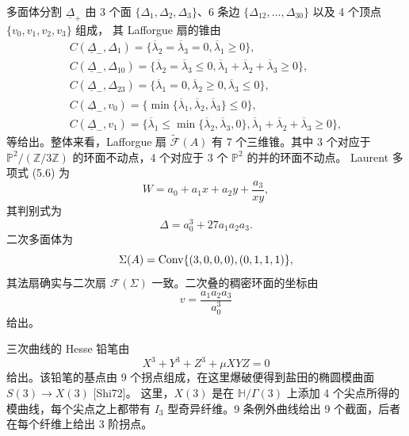 多面体分割 $\underline{\Delta}_{+}$ 由 3 个面 $\{\Delta_{1},\Delta_{2},\Delta_{3}\}$、6 条边
$\{\Delta_{12},\ldots,\Delta_{30}\}$ 以及 4 个顶点 $\{v_{0},v_{1},v_{2},v_{3}\}$ 组成，
其 Lafforgue 扇的锥由
\begin{gather*}
  C(\underline{\Delta}_{-},\Delta_{1})=\{\overline{\lambda}_{2}=\overline{\lambda}_{3}=0,\overline{\lambda}_{1}\ge 0\},\\
  C(\underline{\Delta}_{-},\Delta_{10})=\{\overline{\lambda}_{2}=\overline{\lambda}_{3}\le 0,\overline{\lambda}_{1}+\overline{\lambda}_{2}+\overline{\lambda}_{3}\ge 0\},\\
  C(\underline{\Delta}_{-},\Delta_{23})=\{\overline{\lambda}_{1}=0,\overline{\lambda}_{2}\ge 0,\overline{\lambda}_{3}\le 0\},\\
  C(\underline{\Delta}_{-},v_{0})=\{\min\{\overline{\lambda}_{1},\overline{\lambda}_{2},\overline{\lambda}_{3}\}\le 0\},\\
  C(\underline{\Delta}_{-},v_{1})=\{\overline{\lambda}_{1}\le\min\{\overline{\lambda}_{2},\overline{\lambda}_{3},0\},\overline{\lambda}_{1}+\overline{\lambda}_{2}+\overline{\lambda}_{3}\ge 0\},
\end{gather*}
等给出。整体来看，Lafforgue 扇 $\tilde{\mathcal{F}}(A)$ 有 7 个三维锥。其中 3 个对应于
$\mathbb{P}^{2}/(\mathbb{Z}/3\mathbb{Z})$ 的环面不动点，4 个对应于 3 个 $\mathbb{P}^{2}$ 的并的环面不动点。
Laurent 多项式 (5.6) 为
\begin{equation}
  W=a_{0}+a_{1}x+a_{2}y+\frac{a_{3}}{xy}, \tag{7.3}
\end{equation}
其判别式为
\[
  \Delta=a_{0}^{3}+27a_{1}a_{2}a_{3}.
\]
二次多面体为
\[
  \Sigma(A)=\operatorname{Conv}\{(3,0,0,0),(0,1,1,1)\},
\]
其法扇确实与二次扇 $\mathcal{F}(\Sigma)$ 一致。二次叠的稠密环面的坐标由
\begin{equation}
  v=\frac{a_{1}a_{2}a_{3}}{a_{0}^{3}} \tag{7.4}
\end{equation}
给出。

三次曲线的 Hesse 铅笔由
\begin{equation}
  X^{3}+Y^{3}+Z^{3}+\mu XYZ=0 \tag{7.5}
\end{equation}
给出。该铅笔的基点由 9 个拐点组成，在这里爆破便得到盐田的椭圆模曲面 $S(3)\to X(3)$ [Shi72]。
这里，$X(3)$ 是在 $\mathbb{H}/\Gamma(3)$ 上添加 4 个尖点所得的模曲线，每个尖点之上都带有
$I_{3}$ 型奇异纤维。9 条例外曲线给出 9 个截面，后者在每个纤维上给出 3 阶拐点。

